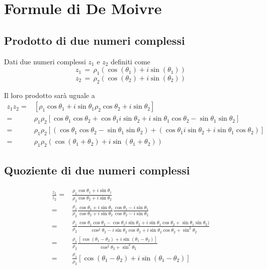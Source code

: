 \documentclass[../../dimostrazioni]{subfiles}
\begin{document}
    \chapter{Formule di De Moivre}

        \section*{Prodotto di due numeri complessi}

            Dati due numeri complessi \(z_1\) e \(z_2\) definiti come
            \[z_1 \, = \, \rho_1(\cos(\theta_1) + i\sin(\theta_1)) \]
            \[z_2 \, = \, \rho_2(\cos(\theta_2) + i\sin(\theta_2)) \]

            Il loro prodotto sarà uguale a
            \begin{align}
                z_1z_2 =& [\rho_1\cos\theta_1+i\sin\theta_1\rho_2\cos\theta_2+i\sin\theta_2] \\
                       =& \rho_1\rho_2 [\cos\theta_1\cos\theta_2 + \cos\theta_1i\sin\theta_2 + i\sin\theta_1\cos\theta_2 - \sin\theta_1\sin\theta_2] \\
                       =& \rho_1\rho_2 [(\cos\theta_1\cos\theta_2 - \sin\theta_1\sin\theta_2) + (\cos\theta_1 i\sin\theta_2 + i\sin\theta_1\cos\theta_2)] \\
                       =& \rho_1\rho_2 (\cos(\theta_1 + \theta_2) + i\sin(\theta_1 + \theta_2))
            \end{align}

        \section*{Quoziente di due numeri complessi}

            \begin{align}
                \frac{z_1}{z_2} =& \frac{\rho_1\cos\theta_1+i\sin\theta_1}{\rho_2\cos\theta_2+i\sin\theta_2} \\
                                =& \frac{\rho_1}{\rho_2} \frac{\cos\theta_1+i\sin\theta_1}{\cos\theta_2+i\sin\theta_2} \frac{\cos\theta_1-i\sin\theta_1}{\cos\theta_2-i\sin\theta_2}\\
                                =& \frac{\rho_1}{\rho_2} \frac{\cos\theta_1\cos\theta_2 - \cos\theta_1 i\sin\theta_2 + i\sin\theta_1\cos\theta_2 + \sin\theta_1\sin\theta_2)}{\cos^2\theta_2 - i\sin\theta_2\cos\theta_2 + i\sin\theta_2\cos\theta_2 + \sin^2\theta_2} \\
                                =& \frac{\rho_1}{\rho_2} \frac{[\cos(\theta_1 - \theta_2) + i\sin(\theta_1 - \theta_2)]}{\cos^2\theta_2 + \sin^2\theta_2} \\
                                =& \frac{\rho_1}{\rho_2} [\cos(\theta_1 - \theta_2) + i\sin(\theta_1 - \theta_2)]
            \end{align}
\end{document}
